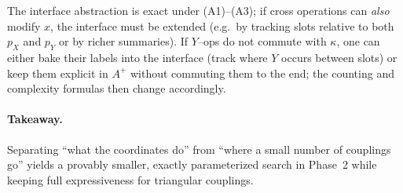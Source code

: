 \documentclass[11pt]{article}
\begin{document}
The interface abstraction is exact under (A1)--(A3); if cross operations can \emph{also} modify $x$, the interface must be extended (e.g.\ by tracking slots relative to both $p_X$ and $p_Y$ or by richer summaries). If $Y$--ops do not commute with $\kappa$, one can either bake their labels into the interface (track where $Y$ occurs between slots) or keep them explicit in $A^{+}$ without commuting them to the end; the counting and complexity formulas then change accordingly.

\paragraph{Takeaway.} Separating ``what the coordinates do'' from ``where a small number of couplings go'' yields a provably smaller, exactly parameterized search in Phase~2 while keeping full expressiveness for triangular couplings.


\end{document}
